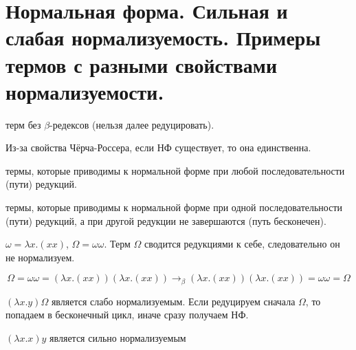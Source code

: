 \section{Нормальная форма. Сильная и слабая нормализуемость. Примеры термов с разными свойствами нормализуемости.}


\begin{definition}
терм без $\beta$-редексов (нельзя далее редуцировать).
\end{definition}

\begin{corollary}
Из-за свойства Чёрча-Россера, если НФ существует, то она единственна.
\end{corollary}

\begin{definition}
термы, которые приводимы к нормальной форме при любой последовательности (пути) редукций.
\end{definition}

\begin{definition}
термы, которые приводимы к нормальной форме при одной последовательности (пути) редукций, а при другой редукции не завершаются (путь бесконечен).
\end{definition}

\begin{example}
$\omega = \lambda x.(xx)$, $\Omega = \omega\omega$.
Терм $\Omega$ сводится редукциями к себе, следовательно он не нормализуем.

\[
\Omega = \omega\omega =  (\lambda x.(xx))(\lambda x.(xx)) \rightarrow_{\beta} (\lambda x.(xx))(\lambda x.(xx)) = \omega\omega = \Omega
\]
\end{example}

\begin{example}
$(\lambda x. y)\Omega$ является слабо нормализуемым.
Если редуцируем сначала $\Omega$, то попадаем в бесконечный цикл, иначе сразу получаем НФ.
\end{example}

\begin{example}
$(\lambda x.x)y$ является сильно нормализуемым
\end{example}
